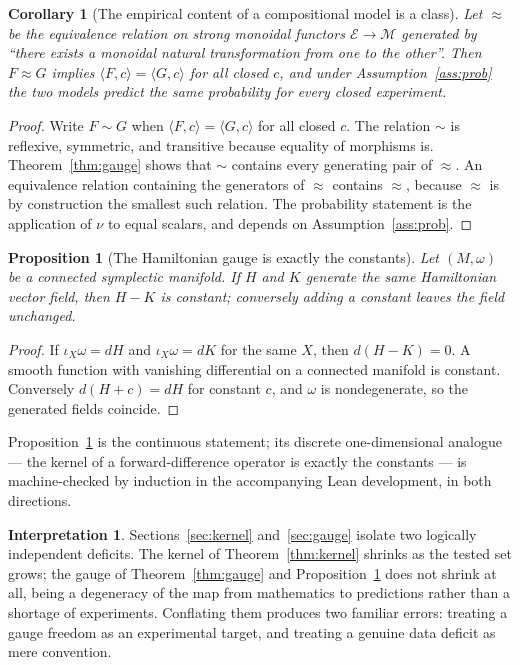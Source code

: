 \documentclass[11pt]{article}
\newtheorem{proposition}[definition]{Proposition}
\newtheorem{corollary}[definition]{Corollary}
\theoremstyle{definition}
\newtheorem{interpretation}[definition]{Interpretation}
\begin{document}
\begin{corollary}[The empirical content of a compositional model is a class]
\label{cor:gaugeclass}
Let $\approx$ be the equivalence relation on strong monoidal functors
$\mathcal E\to\mathcal M$ generated by ``there exists a monoidal natural
transformation from one to the other''. Then $F\approx G$ implies
$\langle F,c\rangle=\langle G,c\rangle$ for all closed $c$, and under
Assumption~\ref{ass:prob} the two models predict the same probability for every
closed experiment.
\end{corollary}
\begin{proof}
Write $F\sim G$ when $\langle F,c\rangle=\langle G,c\rangle$ for all closed $c$.
The relation $\sim$ is reflexive, symmetric, and transitive because equality of
morphisms is. Theorem~\ref{thm:gauge} shows that $\sim$ contains every
generating pair of $\approx$. An equivalence relation containing the generators
of $\approx$ contains $\approx$, because $\approx$ is by construction the
smallest such relation. The probability statement is the application of $\nu$ to
equal scalars, and depends on Assumption~\ref{ass:prob}.
\end{proof}

\begin{proposition}[The Hamiltonian gauge is exactly the constants]
\label{prop:hamgauge}
Let $(M,\omega)$ be a connected symplectic manifold. If $H$ and $K$ generate the
same Hamiltonian vector field, then $H-K$ is constant; conversely adding a
constant leaves the field unchanged.
\end{proposition}
\begin{proof}
If $\iota_{X}\omega=dH$ and $\iota_{X}\omega=dK$ for the same $X$, then
$d(H-K)=0$. A smooth function with vanishing differential on a connected
manifold is constant. Conversely $d(H+c)=dH$ for constant $c$, and $\omega$ is
nondegenerate, so the generated fields coincide.
\end{proof}

Proposition~\ref{prop:hamgauge} is the continuous statement; its discrete
one-dimensional analogue --- the kernel of a forward-difference operator is
exactly the constants --- is machine-checked by induction in the accompanying
Lean development, in both directions.

\begin{interpretation}
\label{int:twogaps}
Sections~\ref{sec:kernel} and~\ref{sec:gauge} isolate two logically independent
deficits. The kernel of Theorem~\ref{thm:kernel} shrinks as the tested set
grows; the gauge of Theorem~\ref{thm:gauge} and Proposition~\ref{prop:hamgauge}
does not shrink at all, being a degeneracy of the map from mathematics to
predictions rather than a shortage of experiments. Conflating them produces two
familiar errors: treating a gauge freedom as an experimental target, and
treating a genuine data deficit as mere convention.
\end{interpretation}
\end{document}
